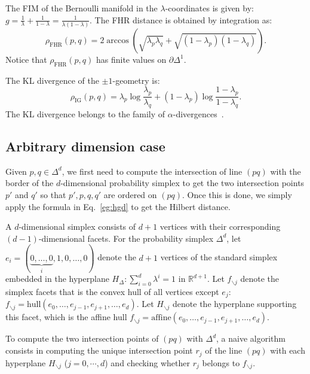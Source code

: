 \documentclass[graybox]{svmult}
\def\bbR{\mathbb{R}}
\def\aff{\mathrm{affine}}
\def\co{\mathrm{hull}}
\begin{document}
The FIM of the Bernoulli manifold in the $\lambda$-coordinates is given by:
$g = \frac{1}{\lambda} + \frac{1}{1-\lambda} = \frac{1}{\lambda(1-\lambda)}$.
The FHR distance is obtained by integration as:
$$
\rho_{\mathrm{FHR}}(p,q) = 2 \arccos\left(\sqrt{\lambda_p\lambda_q}+\sqrt{(1-\lambda_p)(1-\lambda_q)}\right).
$$
Notice that $\rho_{\mathrm{FHR}}(p,q)$ has finite values on $\partial\Delta^1$.

The KL divergence of the $\pm1$-geometry is:
$$
\rho_{\mathrm{IG}}(p,q) = \lambda_p\log\frac{\lambda_p}{\lambda_q} + (1-\lambda_p)\log\frac{1-\lambda_p}{1-\lambda_q}.
$$
The KL divergence belongs to the family of $\alpha$-divergences~\cite{IG-2016}.


\subsection{Arbitrary dimension case}
 
Given $p,q\in\Delta^d$, we first need to compute the intersection of line $(pq)$ with the border of the $d$-dimensional probability simplex to get the two intersection points $p'$ and $q'$ so that $p',p,q,q'$ are ordered on $(pq)$.
Once this is done, we simply apply the formula in Eq.~\ref{eg:hgd} to get the Hilbert distance.

A $d$-dimensional simplex consists of $d+1$ vertices with their corresponding $(d-1)$-dimensional facets.
For the probability simplex $\Delta^d$, let $e_i=(\underbrace{0,\ldots,0}_{i}, 1, 0, \ldots,0)$ denote the $d+1$
vertices of the standard simplex embedded in the hyperplane $H_\Delta: \sum_{i=0}^d \lambda^{i}=1$ in $\bbR^{d+1}$.
Let $f_{\backslash{}j}$ denote the simplex facets that is the convex hull of all vertices except $e_j$: 
$f_{\backslash j}=\co(e_0,\ldots,e_{j-1},e_{j+1},\ldots,e_{d})$.
Let $H_{\backslash{}j}$ denote the hyperplane supporting this facet,
which is the affine hull $f_{\backslash j}=\aff(e_0,\ldots,e_{j-1},e_{j+1},\ldots,e_d)$.

To compute the two intersection points of $(pq)$ with $\Delta^d$, a naive algorithm
consists in computing the unique intersection point $r_j$ of the line $(pq)$ with each hyperplane
$H_{\backslash{}j}$ ($j=0,\cdots,d$) and checking whether $r_j$ belongs to $f_{\backslash{}j}$.
\end{document}
